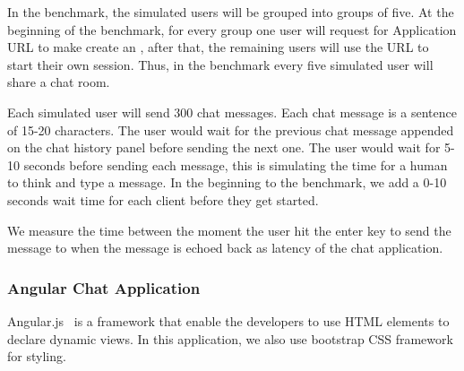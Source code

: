 In the benchmark, 
the simulated users will be grouped into groups of five.
At the beginning of the benchmark, 
for every group one user will request for Application URL to make 
\cb{} create an \appins{},
after that, the remaining users will use the \appins{} URL to start
their own session.
Thus, in the benchmark every five simulated user will share a chat room.

Each simulated user will send 300 chat messages.
Each chat message is a sentence of 15-20 characters.
The user would wait for the previous chat message appended on the chat history
panel before sending the next one.
The user would wait for 5-10 seconds before sending each message,
this is simulating the time for a human to think and type a message.
In the beginning to the benchmark, 
we add a 0-10 seconds wait time for each client before they get started.

We measure the time between the moment 
the user hit the enter key to send the message to 
when the message is echoed back as latency of the chat application.











\subsubsection{Angular Chat Application}
\label{sec:angular}
Angular.js~\cite{angular} is a \js{} framework that enable the developers to 
use HTML elements to declare dynamic views.
In this application, we also use bootstrap CSS framework for styling.

